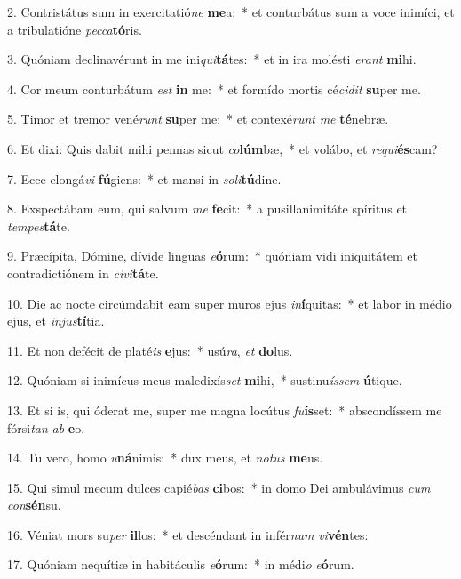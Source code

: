 2. Contristátus sum in exercitatió\textit{ne} \textbf{me}a:~*  et conturbátus sum a voce inimíci, et a tribulatióne \textit{pec}\textit{ca}\textbf{tó}ris.\

3. Quóniam declinavérunt in me ini\textit{qui}\textbf{tá}tes:~*  et in ira molésti \textit{e}\textit{rant} \textbf{mi}hi.\

4. Cor meum conturbátum \textit{est} \textbf{in} me:~*  et formído mortis cé\textit{ci}\textit{dit} \textbf{su}per me.\

5. Timor et tremor vené\textit{runt} \textbf{su}per me:~*  et contexé\textit{runt} \textit{me} \textbf{té}nebræ.\

6. Et dixi: Quis dabit mihi pennas sicut \textit{co}\textbf{lúm}bæ,~*  et volábo, et \textit{re}\textit{qui}\textbf{és}cam?\

7. Ecce elongá\textit{vi} \textbf{fú}giens:~*  et mansi in \textit{so}\textit{li}\textbf{tú}dine.\

8. Exspectábam eum, qui salvum \textit{me} \textbf{fe}cit:~*  a pusillanimitáte spíritus et \textit{tem}\textit{pes}\textbf{tá}te.\

9. Præcípita, Dómine, dívide linguas \textit{e}\textbf{ó}rum:~*  quóniam vidi iniquitátem et contradictiónem in \textit{ci}\textit{vi}\textbf{tá}te.\

10. Die ac nocte circúmdabit eam super muros ejus \textit{in}\textbf{í}quitas:~*  et labor in médio ejus, et \textit{in}\textit{jus}\textbf{tí}tia.\

11. Et non defécit de platé\textit{is} \textbf{e}jus:~*  usú\textit{ra}, \textit{et} \textbf{do}lus.\

12. Quóniam si inimícus meus maledixís\textit{set} \textbf{mi}hi,~*  sustinu\textit{ís}\textit{sem} \textbf{ú}tique.\

13. Et si is, qui óderat me, super me magna locútus \textit{fu}\textbf{ís}set:~*  abscondíssem me fórsi\textit{tan} \textit{ab} \textbf{e}o.\

14. Tu vero, homo \textit{u}\textbf{ná}nimis:~*  dux meus, et \textit{no}\textit{tus} \textbf{me}us.\

15. Qui simul mecum dulces capié\textit{bas} \textbf{ci}bos:~*  in domo Dei ambulávimus \textit{cum} \textit{con}\textbf{sén}su.\

16. Véniat mors su\textit{per} \textbf{il}los:~*  et descéndant in infér\textit{num} \textit{vi}\textbf{vén}tes:\

17. Quóniam nequítiæ in habitáculis \textit{e}\textbf{ó}rum:~*  in médi\textit{o} \textit{e}\textbf{ó}rum.\

